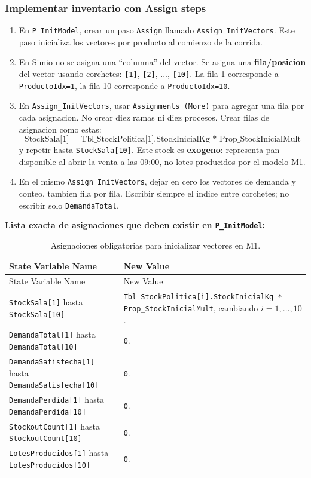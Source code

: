 \documentclass[11pt]{article}
\newcommand{\simio}[1]{\texttt{#1}}
\newcommand{\state}[1]{\texttt{#1}}
\newcommand{\proc}[1]{\texttt{#1}}
\begin{document}
\subsubsection{Implementar inventario con Assign steps}
\begin{enumerate}
  \item En \proc{P\_InitModel}, crear un paso \simio{Assign} llamado \simio{Assign\_InitVectors}. Este paso inicializa los vectores por producto al comienzo de la corrida.
  \item En Simio no se asigna una ``columna'' del vector. Se asigna una \textbf{fila/posicion} del vector usando corchetes: \state{[1]}, \state{[2]}, ..., \state{[10]}. La fila 1 corresponde a \state{ProductoIdx=1}, la fila 10 corresponde a \state{ProductoIdx=10}.
  \item En \simio{Assign\_InitVectors}, usar \simio{Assignments (More)} para agregar una fila por cada asignacion. No crear diez ramas ni diez procesos. Crear filas de asignacion como estas:
  \[
  \text{StockSala[1] = Tbl\_StockPolitica[1].StockInicialKg * Prop\_StockInicialMult}
  \]
  y repetir hasta \state{StockSala[10]}. Este stock es \textbf{exogeno}: representa pan disponible al abrir la venta a las 09:00, no lotes producidos por el modelo M1.
  \item En el mismo \simio{Assign\_InitVectors}, dejar en cero los vectores de demanda y conteo, tambien fila por fila. Escribir siempre el indice entre corchetes; no escribir solo \state{DemandaTotal}.
\end{enumerate}

\textbf{Lista exacta de asignaciones que deben existir en \proc{P\_InitModel}:}

{\small
\begin{longtable}{L{5.2cm}L{7.7cm}}
\caption{Asignaciones obligatorias para inicializar vectores en M1.}\\
\toprule
{}
\color{white}State Variable Name & \color{white}New Value \\
\midrule
\endfirsthead
\toprule
{}
\color{white}State Variable Name & \color{white}New Value \\
\midrule
\endhead
\state{StockSala[1]} hasta \state{StockSala[10]} & \state{Tbl\_StockPolitica[i].StockInicialKg * Prop\_StockInicialMult}, cambiando \(i=1,\ldots,10\). \\
\state{DemandaTotal[1]} hasta \state{DemandaTotal[10]} & \state{0}. \\
\state{DemandaSatisfecha[1]} hasta \state{DemandaSatisfecha[10]} & \state{0}. \\
\state{DemandaPerdida[1]} hasta \state{DemandaPerdida[10]} & \state{0}. \\
\state{StockoutCount[1]} hasta \state{StockoutCount[10]} & \state{0}. \\
\state{LotesProducidos[1]} hasta \state{LotesProducidos[10]} & \state{0}. \\
\bottomrule
\end{longtable}
}
\end{document}
